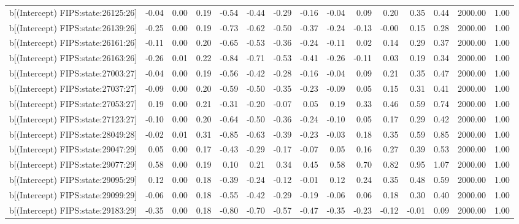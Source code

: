 \begin{table}[ht]
\begin{tabular}{rrrrrrrrrrrrrrr}
  b[(Intercept) FIPS:state:26125:26] & -0.04 & 0.00 & 0.19 & -0.54 & -0.44 & -0.29 & -0.16 & -0.04 & 0.09 & 0.20 & 0.35 & 0.44 & 2000.00 & 1.00 \\ 
  b[(Intercept) FIPS:state:26139:26] & -0.25 & 0.00 & 0.19 & -0.73 & -0.62 & -0.50 & -0.37 & -0.24 & -0.13 & -0.00 & 0.15 & 0.28 & 2000.00 & 1.00 \\ 
  b[(Intercept) FIPS:state:26161:26] & -0.11 & 0.00 & 0.20 & -0.65 & -0.53 & -0.36 & -0.24 & -0.11 & 0.02 & 0.14 & 0.29 & 0.37 & 2000.00 & 1.00 \\ 
  b[(Intercept) FIPS:state:26163:26] & -0.26 & 0.01 & 0.22 & -0.84 & -0.71 & -0.53 & -0.41 & -0.26 & -0.11 & 0.03 & 0.19 & 0.34 & 2000.00 & 1.00 \\ 
  b[(Intercept) FIPS:state:27003:27] & -0.04 & 0.00 & 0.19 & -0.56 & -0.42 & -0.28 & -0.16 & -0.04 & 0.09 & 0.21 & 0.35 & 0.47 & 2000.00 & 1.00 \\ 
  b[(Intercept) FIPS:state:27037:27] & -0.09 & 0.00 & 0.20 & -0.59 & -0.50 & -0.35 & -0.23 & -0.09 & 0.05 & 0.15 & 0.31 & 0.41 & 2000.00 & 1.00 \\ 
  b[(Intercept) FIPS:state:27053:27] & 0.19 & 0.00 & 0.21 & -0.31 & -0.20 & -0.07 & 0.05 & 0.19 & 0.33 & 0.46 & 0.59 & 0.74 & 2000.00 & 1.00 \\ 
  b[(Intercept) FIPS:state:27123:27] & -0.10 & 0.00 & 0.20 & -0.64 & -0.50 & -0.36 & -0.24 & -0.10 & 0.05 & 0.17 & 0.29 & 0.42 & 2000.00 & 1.00 \\ 
  b[(Intercept) FIPS:state:28049:28] & -0.02 & 0.01 & 0.31 & -0.85 & -0.63 & -0.39 & -0.23 & -0.03 & 0.18 & 0.35 & 0.59 & 0.85 & 2000.00 & 1.00 \\ 
  b[(Intercept) FIPS:state:29047:29] & 0.05 & 0.00 & 0.17 & -0.43 & -0.29 & -0.17 & -0.07 & 0.05 & 0.16 & 0.27 & 0.39 & 0.53 & 2000.00 & 1.00 \\ 
  b[(Intercept) FIPS:state:29077:29] & 0.58 & 0.00 & 0.19 & 0.10 & 0.21 & 0.34 & 0.45 & 0.58 & 0.70 & 0.82 & 0.95 & 1.07 & 2000.00 & 1.00 \\ 
  b[(Intercept) FIPS:state:29095:29] & 0.12 & 0.00 & 0.18 & -0.39 & -0.24 & -0.12 & -0.01 & 0.12 & 0.24 & 0.35 & 0.48 & 0.59 & 2000.00 & 1.00 \\ 
  b[(Intercept) FIPS:state:29099:29] & -0.06 & 0.00 & 0.18 & -0.55 & -0.42 & -0.29 & -0.19 & -0.06 & 0.06 & 0.18 & 0.30 & 0.40 & 2000.00 & 1.00 \\ 
  b[(Intercept) FIPS:state:29183:29] & -0.35 & 0.00 & 0.18 & -0.80 & -0.70 & -0.57 & -0.47 & -0.35 & -0.23 & -0.12 & -0.01 & 0.09 & 2000.00 & 1.00 \\ 

\end{tabular}
\end{table}
